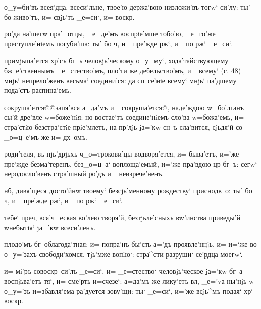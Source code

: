 о_у=би'въ всея'дца, всеси'льне, твое'ю держа'вою 
низложи'въ тогw` си'лу: ты' бо живо'тъ, и= свjь'тъ 
_е=си`, и= воскр.

ро'да на'шегw пра'_отцы, _е=де'мъ воспрiе'мше тобо'ю, 
_е=го'же преступле'нiемъ погуби'ша: ты' бо ч, и= 
пре'жде рж`, и= по рж` _е=си`.


примjьша'ется хр'съ бг~ъ человjь'ческому о_у=му`, 
хода'тайствующему бж~е'ственнымъ _е=стество'мъ, пло'ти же 
дебельство'мъ, и= всему` (с. 48) мнjь` непрело'женъ 
весьма` соедини'ся: да сп~се'нiе всему` мнjь` па'дшему 
пода'стъ распина'емь.

сокруша'ется@{@запя'вся а=да'мъ и= сокруша'ется@}, 
наде'ждою w=бо'лганъ сы'й дре'вле w=боже'нiя: но 
востае'тъ соедине'нiемъ сло'ва w=божа'емь, и= стра'стiю 
безстра'стiе прiе'млетъ, на пр'лjь jа='кw сн~ъ 
сла'вится, сjьдя'й со _о=ц~е'мъ же и= дх~омъ.

роди'теля, въ нjь'дрjьхъ ч _о=трокови'цы 
водворя'ется, и= быва'етъ, и='же пре'жде безма'теренъ, 
без\ъ _о=ц~а` воплоща'емый, и='же пра'вдою цр 
бг~ъ: сегw` неродосло'венъ стра'шный ро'дъ и= 
неизрече'ненъ.


нб, дивя'щеся досто'йнw твоему` безсjь'менному 
рождеству` приснодв~о: ты' бо ч, и= пре'жде 
рж`, и= по рж` _е=си`.

тебе` преч, вся'ч_еская во'лею творя'й, 
безтjьле'сныхъ вw'инства приведы'й w\т небытiя` jа='кw 
всеси'ленъ.

плодо'мъ бг~облагода'тная: и= попра'нъ бы'сть а='дъ 
проявле'ннjь, и= и=`же во о_у='захъ свободи'хомся. 
тjь'мже вопiю`: стра^сти разруши` се'рдца моегw`.


и= мi'ръ совоскр~си'лъ _е=си`, и= _е=стество` 
человjь'ческое jа='кw бг~а воспjьва'етъ тя`, и= сме'рть 
и=счезе`: а=да'мъ же лику'етъ вл, _е='vа ны'нjь w\т 
о_у='зъ и=збавля'ема ра'дуется зову'щи: ты` _е=си`, и='же 
всjь^мъ подая` хр` воскр.


